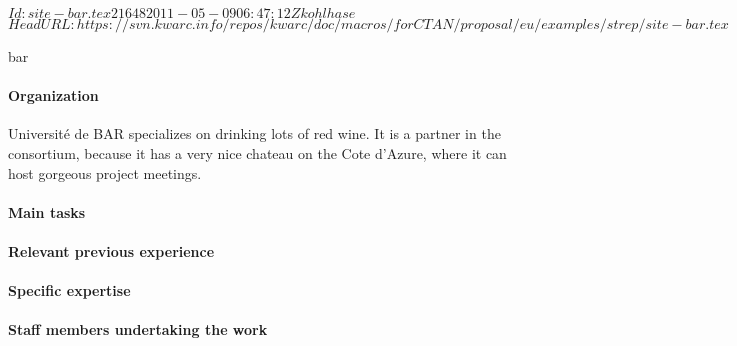 \svnInfo $Id: site-bar.tex 21648 2011-05-09 06:47:12Z kohlhase $
\svnKeyword $HeadURL: https://svn.kwarc.info/repos/kwarc/doc/macros/forCTAN/proposal/eu/examples/strep/site-bar.tex $
\begin{sitedescription}{bar}

\paragraph{Organization}
  Universit\'e de BAR specializes on drinking lots of red wine. It is a partner in the
  consortium, because it has a very nice chateau on the Cote d'Azure, where it can host
  gorgeous project meetings.

\paragraph{Main tasks}
\paragraph{Relevant previous experience}
\paragraph{Specific expertise}
\paragraph{Staff members undertaking the work}

\end{sitedescription}


